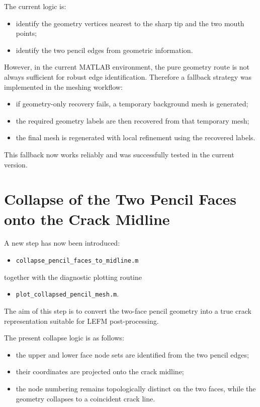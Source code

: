 \documentclass[11pt]{article}
\begin{document}
	The current logic is:
	\begin{itemize}
		\item identify the geometry vertices nearest to the sharp tip and the two mouth points;
		\item identify the two pencil edges from geometric information.
	\end{itemize}
	
	However, in the current MATLAB environment, the pure geometry route is not always sufficient for robust edge identification. Therefore a fallback strategy was implemented in the meshing workflow:
	\begin{itemize}
		\item if geometry-only recovery fails, a temporary background mesh is generated;
		\item the required geometry labels are then recovered from that temporary mesh;
		\item the final mesh is regenerated with local refinement using the recovered labels.
	\end{itemize}
	
	This fallback now works reliably and was successfully tested in the current version.
	
	\section{Collapse of the Two Pencil Faces onto the Crack Midline}
	
	A new step has now been introduced:
	\begin{itemize}
		\item \texttt{collapse\_pencil\_faces\_to\_midline.m}
	\end{itemize}
	together with the diagnostic plotting routine
	\begin{itemize}
		\item \texttt{plot\_collapsed\_pencil\_mesh.m}.
	\end{itemize}
	
	The aim of this step is to convert the two-face pencil geometry into a true crack representation suitable for LEFM post-processing.
	
	The present collapse logic is as follows:
	\begin{itemize}
		\item the upper and lower face node sets are identified from the two pencil edges;
		\item their coordinates are projected onto the crack midline;
		\item the node numbering remains topologically distinct on the two faces, while the geometry collapses to a coincident crack line.
	\end{itemize}
	
\end{document}

